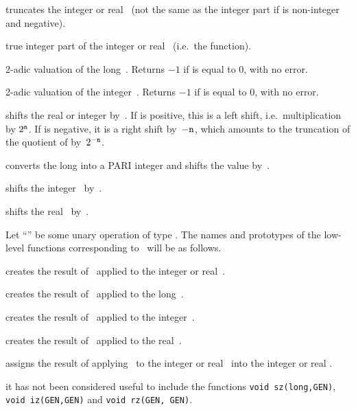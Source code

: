 \smallskip

 truncates the integer or real~
(not the same as the integer part if  is non-integer and negative).

 true integer part of the integer or
real~ (i.e.~the  function).


 2-adic valuation of the long~. Returns $-1$
if  is equal to 0, with no error.

 2-adic valuation of the integer~. Returns $-1$
if  is equal to 0, with no error.

 shifts the real or
integer  by~. If  is positive, this is a left shift,
i.e.~multiplication by $2^{{\tt n}}$. If  is negative, it is a right
shift by~$-{\tt n}$, which amounts to the truncation of the quotient of 
by~$2^{-{\tt n}}$.

 converts the long  into a PARI
integer and shifts the value by~.

 shifts the integer~ by~.

 shifts the real~ by~.


\noindent
Let ``\op'' be some unary operation of type . The names and
prototypes of the low-level functions corresponding to \op\ will be as follows.

 creates the result of \op\ applied to the integer
or real~.

 creates the result of \op\ applied to the
long~.

 creates the result of \op\ applied to the
integer~.

 creates the result of \op\ applied to the real~.

 assigns the result of applying \op\ to the
integer or real~ into the integer or real .

 it has not been considered useful to include the
functions {\tt void \op sz(long,GEN)}, {\tt void \op iz(GEN,GEN)} and
{\tt void \op rz(GEN, GEN)}.
\smallskip

